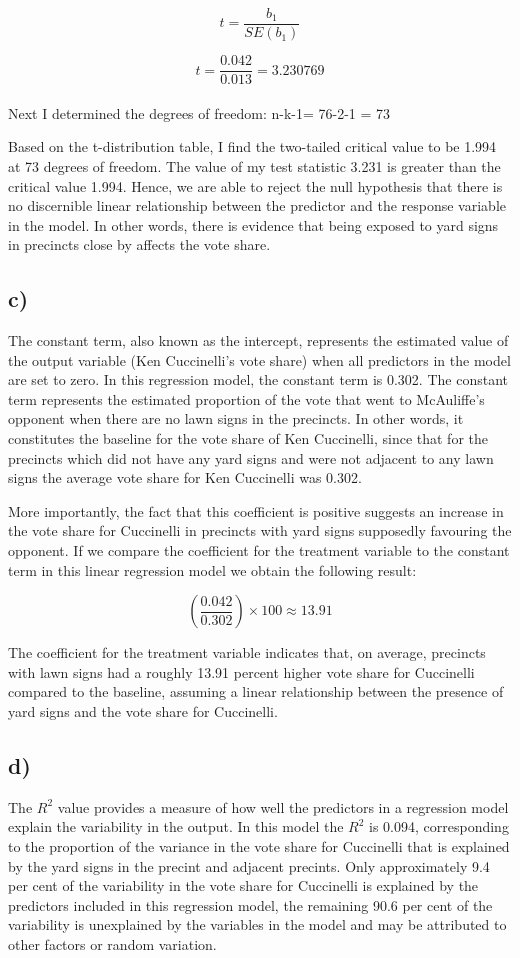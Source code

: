 \documentclass[oneside]{article}
\begin{document}
\[ t = \frac{b_1}{SE(b_1)} \]

\[ t = \frac{0.042}{0.013} = 3.230769\]
\\
Next I determined the degrees of freedom: n-k-1= 76-2-1 = 73

Based on the t-distribution table, I find the two-tailed critical value to be 1.994 at 73 degrees of freedom. The value of my test statistic 3.231 is greater than the critical value 1.994. Hence, we are able to reject the null hypothesis that there is no discernible linear relationship between the predictor and the response variable in the model. In other words, there is evidence that being exposed to yard signs in precincts close by affects the vote share.

\subsection*{c)}
The constant term, also known as the intercept, represents the estimated value of the output variable (Ken Cuccinelli's vote share) when all predictors in the model are set to zero. In this regression model, the constant term is 0.302. 
The constant term represents the estimated proportion of the vote that went to McAuliffe's opponent when there are no lawn signs in the precincts.
In other words, it constitutes the baseline for the vote share of Ken Cuccinelli, since that for the precincts which did not have any yard signs and were not adjacent to any lawn signs the average vote share for Ken Cuccinelli was 0.302.

More importantly, the fact that this coefficient is positive suggests an increase in the vote share for Cuccinelli in precincts with yard signs supposedly favouring the opponent. 
If we compare the coefficient for the treatment variable to the constant term in this linear regression model we obtain the following result:

\[
\left( \frac{0.042}{0.302} \right) \times 100 \approx 13.91
\]

The coefficient for the treatment variable indicates that, on average, precincts with lawn signs had a roughly 13.91 percent higher vote share for Cuccinelli compared to the baseline, assuming a linear relationship between the presence of yard signs and the vote share for Cuccinelli.

\subsection*{d)}

The $R^2$ value provides a measure of how well the predictors in a regression model explain the variability in the output. In this model the $R^2$ is 0.094, corresponding to the proportion of the variance in the vote share for Cuccinelli that is explained by the yard signs in the precint and adjacent precints. Only approximately 9.4 per cent of the variability in the vote share for Cuccinelli is explained by the predictors included in this regression model, the remaining 90.6 per cent of the variability is unexplained by the variables in the model and may be attributed to other factors or random variation.
\end{document}
